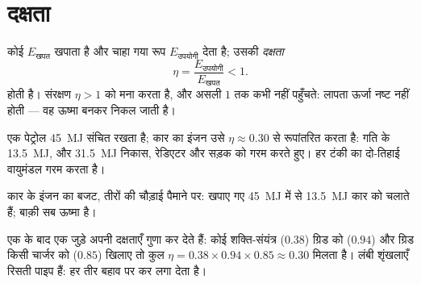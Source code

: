 \section{दक्षता}

\begin{definition}[दक्षता]\label{def:g10:energy-conservation:efficiency}
कोई  $E_{\text{खपत}}$ खपाता है और चाहा गया रूप $E_{\text{उपयोगी}}$ देता है;
उसकी \emph{दक्षता}
\[
\eta = \frac{E_{\text{उपयोगी}}}{E_{\text{खपत}}} < 1 .
\]
होती है। संरक्षण $\eta > 1$ को मना करता है, और असली  $1$
तक कभी नहीं पहुँचते: लापता ऊर्जा नष्ट नहीं होती --- वह ऊष्मा
बनकर निकल जाती है।
\end{definition}

\begin{example}[पेट्रोल कहाँ जाता है]\label{ex:g10:energy-conservation:engine}
एक  पेट्रोल \qty{45}{MJ}  संचित रखता
है; कार का इंजन उसे $\eta \approx 0.30$ से रूपांतरित करता है: गति के \qty{13.5}{MJ}, और
\qty{31.5}{MJ} निकास, रेडिएटर और सड़क को गरम करते हुए। हर टंकी का दो-तिहाई
वायुमंडल गरम करता है।
\end{example}

\begin{omfigure}

{\small कार के इंजन का बजट, तीरों की चौड़ाई पैमाने पर: खपाए गए \qty{45}{MJ} में
से \qty{13.5}{MJ} कार को चलाते हैं; बाक़ी सब ऊष्मा है।}
\end{omfigure}

\begin{remark}[दक्षताएँ गुणा होती हैं]\label{rem:g10:energy-conservation:chain-eta}
एक के बाद एक जुड़े  अपनी दक्षताएँ गुणा कर देते हैं: कोई
शक्ति-संयंत्र ($0.38$) ग्रिड को ($0.94$) और ग्रिड किसी चार्जर को
($0.85$) खिलाए तो कुल $\eta = 0.38 \times 0.94 \times 0.85 \approx 0.30$ मिलता है। लंबी शृंखलाएँ रिसती पाइप हैं: हर
तीर बहाव पर कर लगा देता है।
\end{remark}


